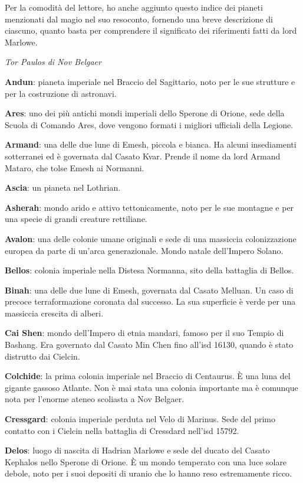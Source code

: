 Per la comodità del lettore, ho anche aggiunto questo indice dei pianeti
menzionati dal magio nel suo resoconto, fornendo una breve descrizione
di ciascuno, quanto basta per comprendere il significato dei riferimenti
fatti da lord Marlowe.

\emph{Tor Paulos di Nov Belgaer}

\textbf{Andun}: pianeta imperiale nel Braccio del Sagittario, noto per
le sue strutture e per la costruzione di astronavi.

\textbf{Ares}: uno dei più antichi mondi imperiali dello Sperone di
Orione, sede della Scuola di Comando Ares, dove vengono formati i
migliori ufficiali della Legione.

\textbf{Armand}: una delle due lune di Emesh, piccola e bianca. Ha
alcuni insediamenti sotterranei ed è governata dal Casato Kvar. Prende
il nome da lord Armand Mataro, che tolse Emesh ai Normanni.

\textbf{Ascia}: un pianeta nel Lothrian.

\textbf{Asherah}: mondo arido e attivo tettonicamente, noto per le sue
montagne e per una specie di grandi creature rettiliane.

\textbf{Avalon}: una delle colonie umane originali e sede di una
massiccia colonizzazione europea da parte di un'arca generazionale.
Mondo natale dell'Impero Solano.

\textbf{Bellos}: colonia imperiale nella Distesa Normanna, sito della
battaglia di Bellos.

\textbf{Binah}: una delle due lune di Emesh, governata dal Casato
Melluan. Un caso di precoce terraformazione coronata dal successo. La
sua superficie è verde per una massiccia crescita di alberi.

\textbf{Cai Shen}: mondo dell'Impero di etnia mandari, famoso per il suo
Tempio di Bashang. Era governato dal Casato Min Chen fino
all'\foreignlanguage{italian}{isd} 16130, quando è stato distrutto dai
Cielcin.

\textbf{Colchide}: la prima colonia imperiale nel Braccio di Centaurus.
È una luna del gigante gassoso Atlante. Non è mai stata una colonia
importante ma è comunque nota per l'enorme ateneo scoliasta a Nov
Belgaer.

\textbf{Cressgard}: colonia imperiale perduta nel Velo di Marinus. Sede
del primo contatto con i Cielcin nella battaglia di Cressdard
nell'\foreignlanguage{italian}{isd} 15792.

\textbf{Delos}: luogo di nascita di Hadrian Marlowe e sede del ducato
del Casato Kephalos nello Sperone di Orione. È un mondo temperato con
una luce solare debole, noto per i suoi depositi di uranio che lo hanno
reso estremamente ricco.

